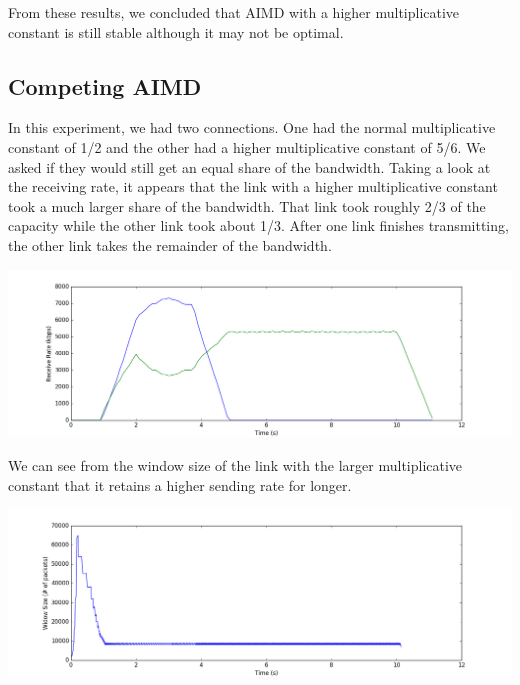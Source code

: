 \documentclass[11pt]{article}
\begin{document}
\vspace{5mm}

From these results, we concluded that AIMD with a higher multiplicative constant is still stable although it may not be optimal.

\subsection{Competing AIMD}

In this experiment, we had two connections. One had the normal multiplicative constant of 1/2 and the other had a higher multiplicative constant of 5/6. We asked if they would still get an equal share of the bandwidth. Taking a look at the receiving rate, it appears that the link with a higher multiplicative constant took a much larger share of the bandwidth. That link took roughly 2/3 of the capacity while the other link took about 1/3. After one link finishes transmitting, the other link takes the remainder of the bandwidth.

\vspace{5mm}

\includegraphics[width=17cm]{charts/advanced/competingAimd/rateTime.png}

\vspace{5mm}

We can see from the window size of the link with the larger multiplicative constant that it retains a higher sending rate for longer.

\vspace{5mm}

\includegraphics[width=17cm]{charts/advanced/competingAimd/windowSize2.png}
\end{document}
